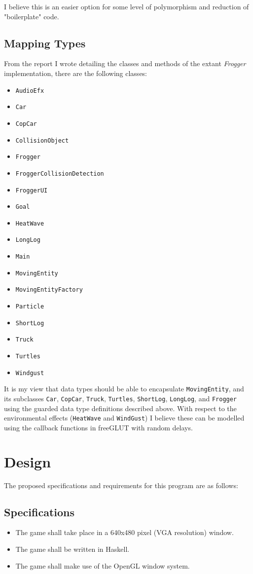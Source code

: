 \documentclass[12pt, a4paper]{report}
\begin{document}
I believe this is an easier option for some level of polymorphism and reduction of "boilerplate" code.

\subsection{Mapping Types}
From the report I wrote detailing the classes and methods of the extant \textit{Frogger} implementation, there are the following classes:
\begin{itemize}
  \item \verb|AudioEfx|
  \item \verb|Car|
  \item \verb|CopCar|
  \item \verb|CollisionObject|
  \item \verb|Frogger|
  \item \verb|FroggerCollisionDetection|
  \item \verb|FroggerUI|
  \item \verb|Goal|
  \item \verb|HeatWave|
  \item \verb|LongLog|
  \item \verb|Main|
  \item \verb|MovingEntity|
  \item \verb|MovingEntityFactory|
  \item \verb|Particle|
  \item \verb|ShortLog|
  \item \verb|Truck|
  \item \verb|Turtles|
  \item \verb|Windgust|
\end{itemize}

It is my view that data types should be able to encapsulate \verb|MovingEntity|, and its subclasses \verb|Car|, \verb|CopCar|, \verb|Truck|, \verb|Turtles|, \verb|ShortLog|, \verb|LongLog|, and \verb|Frogger| using the guarded data type definitions described above.
With respect to the environmental effects (\verb|HeatWave| and \verb|WindGust|) I believe these can be modelled using the callback functions in freeGLUT with random delays.

\section{Design}
The proposed specifications and requirements for this program are as follows:

\subsection{Specifications}
\begin{itemize}
  \item The game shall take place in a 640x480 pixel (VGA resolution) window.
  \item The game shall be written in Haskell.
  \item The game shall make use of the OpenGL window system.
\end{itemize}
\end{document}
